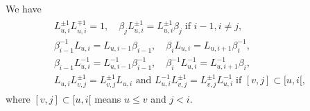 \documentclass[a4paper,11pt]{amsart}
\newcommand{\jm}{L}
\numberwithin{equation}{section}
\begin{document}
\begin{lemma}\label{lemma:jm-elements}
We have
\begin{gather}\label{eq:jm-relations}
\begin{gathered}
\jm_{u,i}^{\pm 1}\jm_{u,i}^{\mp 1}=1
,\quad
\beta_{j}\jm_{u,i}^{\pm 1}
=
\jm_{u,i}^{\pm 1}\beta_{j}
\;\text{if }i-1,i\neq j,
\\
\beta_{i-1}^{-1}\jm_{u,i}
=
\jm_{u,i-1}\beta_{i-1}
,\quad
\beta_{i}\jm_{u,i}
=
\jm_{u,i+1}\beta_{i}^{-1}
,\\
\beta_{i-1}\jm_{u,i}^{-1}
=
\jm_{u,i-1}^{-1}\beta_{i-1}^{-1}
,\quad
\beta_{i}^{-1}\jm_{u,i}^{-1}
=
\jm_{u,i+1}^{-1}\beta_{i}
,
\\
\jm_{u,i}\jm_{v,j}^{\pm 1}
=\jm_{v,j}^{\pm 1}\jm_{u,i}
\text{ and }
\jm_{u,i}^{-1}\jm_{v,j}^{\pm 1}
=\jm_{v,j}^{\pm 1}\jm_{u,i}^{-1}
\;\text{if }[v,j]\subset[u,i[,
\end{gathered}
\end{gather}
where $[v,j]\subset[u,i[$ means $u\leq v$ and $j<i$. 
\end{lemma}
\end{document}
